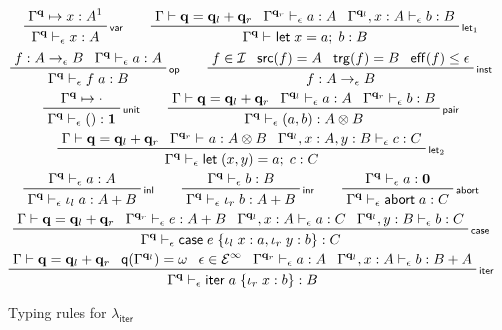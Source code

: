 \documentclass[acmsmall,screen,review]{acmart}
\newcommand{\mc}[1]{\ensuremath{\mathcal{#1}}}
\newcommand{\mb}[1]{\ensuremath{\mathbf{#1}}}
\newcommand{\ms}[1]{\ensuremath{\mathsf{#1}}}
\newcommand{\lto}{:}
\newcommand{\linl}[1]{\iota_l\;{#1}}
\newcommand{\linr}[1]{\iota_r\;{#1}}
\newcommand{\labort}[1]{\ms{abort}\;{#1}}
\newcommand{\letexpr}[3]{\ensuremath{\ms{let}\;#1 = #2;\;#3}}
\newcommand{\caseexpr}[5]{\ms{case}\;#1\;\{\linl{#2} \lto #3, \linr{#4} \lto #5\}}
\newcommand{\liter}[3]{\ms{iter}\;#1\;\{ \linr{#2} \lto #3 \}}
\newcommand{\einf}[1]{#1 \in \mc{E}^\infty}
\newcommand{\qsp}[4]{#1 \vdash #2 = #3 + #4}
\newcommand{\cwk}[2]{#1 \mapsto #2}
\newcommand{\rle}[1]{{\scriptsize\textsf{#1}}}
\newcommand{\hasty}[4]{#1 \vdash_{#2} #3: {#4}}
\newcommand{\subiterexp}{\texorpdfstring{\(\lambda_{\ms{iter}}\)}{lambda-iter}}
\newcommand{\oneq}{1}
\newcommand{\topq}{\omega}
\newcommand{\alquant}{\ms{q}}
\begin{document}
\begin{figure}
  \begin{gather*}
    \prftree[r]{\rle{var}}
      {\cwk{\Gamma^{\mb{q}}}{x : A^\oneq}}
        {\hasty{\Gamma^{\mb{q}}}{\epsilon}{x}{A}} 
      \qquad
    \prftree[r]{\rle{let$_1$}}{\qsp{\Gamma}{\mb{q}}{\mb{q}_l}{\mb{q}_r}}
      {\hasty{\Gamma^{\mb{q}_r}}{\epsilon}{a}{A}}
      {\hasty{\Gamma^{\mb{q}_l}, x : A}{\epsilon}{b}{B}}
      {\hasty{\Gamma^{\mb{q}}}{}{\letexpr{x}{a}{b}}{B}}
      \\
    \prftree[r]{\rle{op}}{f : A \to_\epsilon B}
      {\hasty{\Gamma^{\mb{q}}}{\epsilon}{a}{A}}
      {\hasty{\Gamma^{\mb{q}}}{\epsilon}{f\;a}{B}}
      \qquad
    \prftree[r]{\rle{inst}}
      {f \in \mc{I}}
      {\ms{src}(f) = A}
      {\ms{trg}(f) = B}
      {\ms{eff}(f) \leq \epsilon}
      {f : A \to_\epsilon B}
      \\
    \prftree[r]{\rle{unit}}
      {\cwk{\Gamma^{\mb{q}}}{\cdot}}{\hasty{\Gamma^{\mb{q}}}{\epsilon}{()}{\mb{1}}} 
      \qquad
    \prftree[r]{\rle{pair}}{\qsp{\Gamma}{\mb{q}}{\mb{q}_l}{\mb{q}_r}}
      {\hasty{\Gamma^{\mb{q}_l}}{\epsilon}{a}{A}}
      {\hasty{\Gamma^{\mb{q}_r}}{\epsilon}{b}{B}}
      {\hasty{\Gamma^{\mb{q}}}{\epsilon}{(a, b)}{A \otimes B}} \\
    \prftree[r]{\rle{let$_2$}}{\qsp{\Gamma}{\mb{q}}{\mb{q}_l}{\mb{q}_r}}
      {\hasty{\Gamma^{\mb{q}_r}}{}{a}{A \otimes B}}
      {\hasty{\Gamma^{\mb{q}_l}, x : A, y : B}{\epsilon}{c}{C}}
      {\hasty{\Gamma^{\mb{q}}}{\epsilon}{\letexpr{(x, y)}{a}{c}}{C}}
      \\
    \prftree[r]{\rle{inl}}
      {\hasty{\Gamma^{\mb{q}}}{\epsilon}{a}{A}}
      {\hasty{\Gamma^{\mb{q}}}{\epsilon}{\linl{a}}{A + B}} \qquad
    \prftree[r]{\rle{inr}}
      {\hasty{\Gamma^{\mb{q}}}{\epsilon}{b}{B}}
      {\hasty{\Gamma^{\mb{q}}}{\epsilon}{\linr{b}}{A + B}} \qquad    
    \prftree[r]{\rle{abort}}
      {\hasty{\Gamma^{\mb{q}}}{\epsilon}{a}{\mb{0}}}
      {\hasty{\Gamma^{\mb{q}}}{\epsilon}{\labort{a}}{C}}
      \\
    \prftree[r]{\rle{case}}{\qsp{\Gamma}{\mb{q}}{\mb{q}_l}{\mb{q}_r}}
      {\hasty{\Gamma^{\mb{q}_r}}{\epsilon}{e}{A + B}}
      {\hasty{\Gamma^{\mb{q}_l}, x : A}{\epsilon}{a}{C}}
      {\hasty{\Gamma^{\mb{q}_l}, y : B}{\epsilon}{b}{C}}
      {\hasty{\Gamma^{\mb{q}}}{\epsilon}{\caseexpr{e}{x}{a}{y}{b}}{C}} \\
    \prftree[r]{\rle{iter}}
      {\qsp{\Gamma}{\mb{q}}{\mb{q}_l}{\mb{q}_r}}
      {\alquant(\Gamma^{\mb{q}_l}) = \topq}
      {\einf{\epsilon}}
      {\hasty{\Gamma^{\mb{q}_r}}{\epsilon}{a}{A}}
      {\hasty{\Gamma^{\mb{q}_l}, x : A}{\epsilon}{b}{B + A}}
      {\hasty{\Gamma^{\mb{q}}}{\epsilon}{\liter{a}{x}{b}}{B}}
  \end{gather*}
  \caption{Typing rules for \subiterexp{}}
  \Description{}
  \label{fig:expr-typing}
\end{figure}
\end{document}
